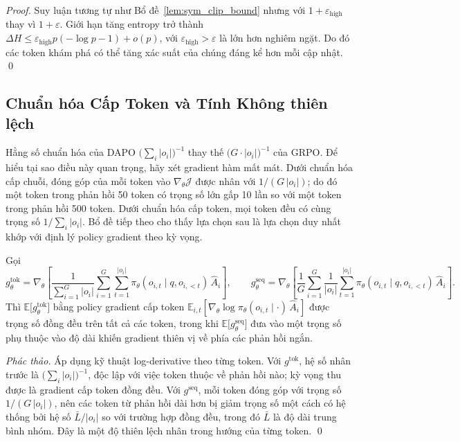 \documentclass[11pt,a4paper]{article}
\begin{document}
\begin{proof}
Suy luận tương tự như Bổ đề~\ref{lem:sym_clip_bound} nhưng với \(1+\varepsilon_{\text{high}}\) thay vì \(1+\varepsilon\). Giới hạn tăng entropy trở thành
\(\Delta H \le \varepsilon_{\text{high}} p (-\log p -1) + o(p)\), với \(\varepsilon_{\text{high}}>\varepsilon\) là lớn hơn nghiêm ngặt. Do đó các token khám phá có thể tăng xác suất của chúng đáng kể hơn mỗi cập nhật. \qed
\end{proof}

\subsection{Chuẩn hóa Cấp Token và Tính Không thiên lệch}\label{sec:tokenlevel}

Hằng số chuẩn hóa của DAPO \(\bigl(\sum_i|o_i|\bigr)^{-1}\) thay thế
\(\bigl(G\cdot|o_i|\bigr)^{-1}\) của GRPO. Để hiểu tại sao điều này quan trọng, hãy xét
gradient hàm mất mát. Dưới chuẩn hóa cấp chuỗi, đóng góp của mỗi token vào
\(\nabla_\theta\mathcal{J}\) được nhân với \(1/(G\,|o_i|)\); do đó một token trong phản hồi
50 token có trọng số lớn gấp 10 lần so với một token trong phản hồi 500 token.
Dưới chuẩn hóa cấp token, mọi token đều có cùng trọng số
\(1/\sum_i |o_i|\). Bổ đề tiếp theo cho thấy lựa chọn sau là lựa chọn duy nhất
khớp với định lý policy gradient theo kỳ vọng.

\begin{lemma}\label{lem:tokenlevel_unbiased}
Gọi
\[
  g^{\text{tok}}_\theta = \nabla_\theta\!\left[
    \frac{1}{\sum_{i=1}^G|o_i|}\sum_{i=1}^G\sum_{t=1}^{|o_i|}
    \pi_\theta(o_{i,t}\mid q,o_{i,<t})\,\hat{A}_i
  \right],\qquad
  g^{\text{seq}}_\theta = \nabla_\theta\!\left[
    \frac{1}{G}\sum_{i=1}^G\frac{1}{|o_i|}\sum_{t=1}^{|o_i|}
    \pi_\theta(o_{i,t}\mid q,o_{i,<t})\,\hat{A}_i
  \right].
\]
Thì \(\mathbb{E}\bigl[g^{\text{tok}}_\theta\bigr]\) bằng policy gradient cấp token
\(\mathbb{E}_{i,t}[\nabla_\theta\log\pi_\theta(o_{i,t}\mid\cdot)\,\hat{A}_i]\)
được trọng số đồng đều trên tất cả các token, trong khi
\(\mathbb{E}\bigl[g^{\text{seq}}_\theta\bigr]\) đưa vào một trọng số phụ thuộc vào độ dài
khiến gradient thiên vị về phía các phản hồi ngắn.
\end{lemma}

\begin{proof}[Phác thảo]
Áp dụng kỹ thuật log-derivative theo từng token. Với \(g^{\text{tok}}\), hệ số nhân trước là
\(\bigl(\sum_i|o_i|\bigr)^{-1}\), độc lập với việc token thuộc về phản hồi nào;
kỳ vọng thu được là gradient cấp token đồng đều. Với
\(g^{\text{seq}}\), mỗi token đóng góp với trọng số
\(1/(G\,|o_i|)\), nên các token từ phản hồi dài hơn bị giảm trọng số một cách có hệ thống bởi
hệ số \(\bar L / |o_i|\) so với trường hợp đồng đều, trong đó \(\bar L\) là
độ dài trung bình nhóm. Đây là một độ thiên lệch nhân trong hướng của từng token.
\qed
\end{proof}
\end{document}
